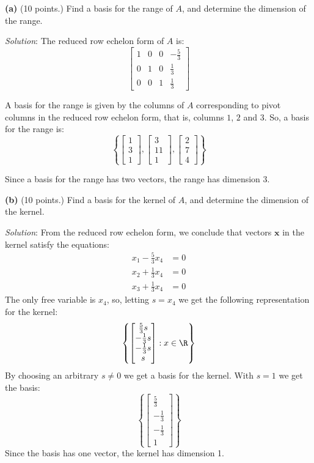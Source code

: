 \documentclass[12pt]{article}
\begin{document}
\textbf{(a)} (10 points.) Find a basis for the range of $A$, and determine the dimension of the range.

\emph{Solution}: The reduced row echelon form of $A$ is:
\[
\left[\begin{matrix}1 & 0 & 0 & - \frac{5}{3}\\0 & 1 & 0 & \frac{1}{3}\\0 & 0 & 1 & \frac{1}{3}\end{matrix}\right]
\]


A basis for the range is given by the columns of $A$ corresponding to pivot columns in the reduced row echelon form, that is, columns $1$, $2$ and $3$. So, a basis for the range is:
\[
\left\{
\begin{bmatrix}1\\3\\1\end{bmatrix},
\begin{bmatrix}3\\11\\1\end{bmatrix},
\begin{bmatrix}2\\7\\4\end{bmatrix}
\right\}
\]

Since a basis for the range has two vectors, the range has dimension 3.
\proofend

\textbf{(b)} (10 points.) Find a basis for the kernel of $A$, and determine the dimension of the kernel.

\emph{Solution}: From the reduced row echelon form, we conclude that vectors $\mathbf{x}$ in the kernel satisfy the equations:
\begin{align*}
x_1-\frac{5}{3}x_4&=0\\
x_2+\frac{1}{3}x_4&=0\\
x_3+\frac{1}{3}x_4&=0
\end{align*}
The only free variable is $x_4$, so, letting $s=x_4$ we get the following representation for the kernel:
\[
\left\{
\begin{bmatrix}\frac{5}{3}s\\-\frac{1}{3}s\\-\frac{1}{3}s\\s\end{bmatrix} : x\in\R
\right\}
\]
By choosing an arbitrary $s\ne 0$ we get a basis for the kernel. With $s=1$ we get the basis:
\[
\left\{
\begin{bmatrix}\frac{5}{3}\\-\frac{1}{3}\\-\frac{1}{3}\\1\end{bmatrix}
\right\}
\]
Since the basis has one vector, the kernel has dimension 1.
\proofend
\end{document}
